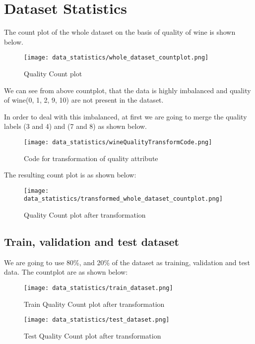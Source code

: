 \section{Dataset Statistics}
The count plot of the whole dataset on the basis of quality of wine is shown below.

\begin{figure}[H]
    \centering
    \texttt{[image: data\_statistics/whole\_dataset\_countplot.png]}
    \caption{Quality Count plot}
    \label{fig:Quality Count plot}
\end{figure}

We can see from above countplot, that the data is highly imbalanced and quality of wine(0, 1, 2, 9, 10) are not present in the dataset.

In order to deal with this imbalanced, at first we are going to merge the quality labels (3 and 4) and (7 and 8) as shown below.


\begin{figure}[H]
    \centering
    \texttt{[image: data\_statistics/wineQualityTransformCode.png]}
    \caption{Code for transformation of quality attribute}
    \label{fig:Code for transformation of quality attribute}
\end{figure}

The resulting count plot is as shown below:
\begin{figure}[H]
    \centering
    \texttt{[image: data\_statistics/transformed\_whole\_dataset\_countplot.png]}
    \caption{Quality Count plot after transformation}
    \label{fig:Quality Count plot after transformation}
\end{figure}

\subsection{Train, validation and test dataset}
We are going to use 80\%, and 20\% of the dataset as training, validation and test data. The countplot are as shown below:

\begin{figure}[H]
    \centering
    \texttt{[image: data\_statistics/train\_dataset.png]}
    \caption{Train Quality Count plot after transformation}
    \label{fig:Train Quality Count plot after transformation}
\end{figure}


\begin{figure}[H]
    \centering
    \texttt{[image: data\_statistics/test\_dataset.png]}
    \caption{Test Quality Count plot after transformation}
    \label{fig:Test Quality Count plot after transformation}
\end{figure}

